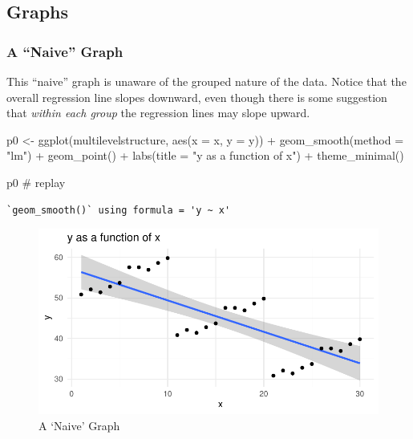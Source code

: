 \documentclass[
  letterpaper,
  DIV=11,
  numbers=noendperiod]{scrreprt}
\newenvironment{Shaded}{\begin{snugshade}}{\end{snugshade}}
\newcommand{\AttributeTok}[1]{\textcolor[rgb]{0.40,0.45,0.13}{#1}}
\newcommand{\CommentTok}[1]{\textcolor[rgb]{0.37,0.37,0.37}{#1}}
\newcommand{\FunctionTok}[1]{\textcolor[rgb]{0.28,0.35,0.67}{#1}}
\newcommand{\NormalTok}[1]{\textcolor[rgb]{0.00,0.23,0.31}{#1}}
\newcommand{\OtherTok}[1]{\textcolor[rgb]{0.00,0.23,0.31}{#1}}
\newcommand{\SpecialCharTok}[1]{\textcolor[rgb]{0.37,0.37,0.37}{#1}}
\newcommand{\StringTok}[1]{\textcolor[rgb]{0.13,0.47,0.30}{#1}}
\begin{document}
\hypertarget{graphs}{%
\subsection{Graphs}\label{graphs}}

\hypertarget{a-naive-graph}{%
\subsubsection{A ``Naive'' Graph}\label{a-naive-graph}}

This ``naive'' graph is unaware of the grouped nature of the data.
Notice that the overall regression line slopes downward, even though
there is some suggestion that \emph{within each group} the regression
lines may slope upward.

\begin{Shaded}
\begin{Highlighting}[]
\NormalTok{p0 }\OtherTok{\textless{}{-}} \FunctionTok{ggplot}\NormalTok{(multilevelstructure, }
             \FunctionTok{aes}\NormalTok{(}\AttributeTok{x =}\NormalTok{ x,}
                 \AttributeTok{y =}\NormalTok{ y)) }\SpecialCharTok{+}
  \FunctionTok{geom\_smooth}\NormalTok{(}\AttributeTok{method =} \StringTok{"lm"}\NormalTok{) }\SpecialCharTok{+}
  \FunctionTok{geom\_point}\NormalTok{() }\SpecialCharTok{+}
  \FunctionTok{labs}\NormalTok{(}\AttributeTok{title =} \StringTok{"y as a function of x"}\NormalTok{) }\SpecialCharTok{+}
  \FunctionTok{theme\_minimal}\NormalTok{()}

\NormalTok{p0  }\CommentTok{\# replay }
\end{Highlighting}
\end{Shaded}

\begin{verbatim}
`geom_smooth()` using formula = 'y ~ x'
\end{verbatim}

\begin{figure}[H]

{\centering \includegraphics{./cross-sectional_files/figure-pdf/fig-naive-1.pdf}

}

\caption{\label{fig-naive}A `Naive' Graph}

\end{figure}
\end{document}
